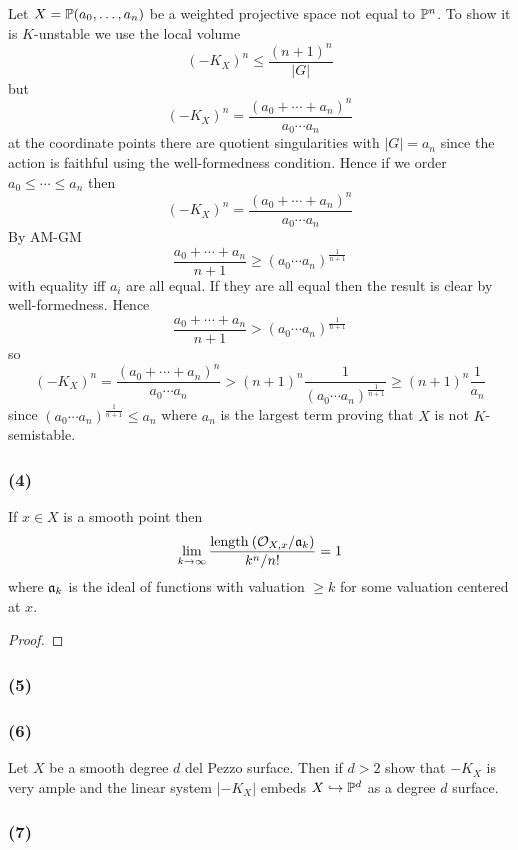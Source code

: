 \documentclass[12pt]{article}
\begin{document}
Let $X = \P(a_0, \dots, a_n)$ be a weighted projective space not equal to $\P^n$. To show it is $K$-unstable we use the local volume
\[ (-K_X)^n \le \frac{(n+1)^n}{|G|} \]
but
\[ (-K_X)^n = \frac{(a_0 + \cdots + a_n)^n}{a_0 \cdots a_n} \]
at the coordinate points there are quotient singularities with $|G| = a_n$ since the action is faithful using the well-formedness condition. Hence if we order $a_0 \le \cdots \le a_n$ then
\[ (-K_X)^n = \frac{(a_0 + \cdots + a_n)^n}{a_0 \cdots a_n}  \]
By AM-GM
\[ \frac{a_0 + \cdots + a_n}{n+1} \ge (a_0 \cdots a_n)^{\frac{1}{n+1}} \]
with equality iff $a_i$ are all equal. If they are all equal then the result is clear by well-formedness. Hence 
\[ \frac{a_0 + \cdots + a_n}{n+1} > (a_0 \cdots a_n)^{\frac{1}{n+1}} \]
so 
\[ (-K_X)^n = \frac{(a_0 + \cdots + a_n)^{n}}{a_0 \cdots a_n} > (n+1)^n \frac{1}{(a_0 \cdots a_n)^{\frac{1}{n+1}}} \ge (n+1)^n \frac{1}{a_n} \]
since $(a_0 \cdots a_n)^{\frac{1}{n+1}} \le a_n$ where $a_n$ is the largest term proving that $X$ is not $K$-semistable.


\subsubsection{(4)}

\begin{lemma}
If $x \in X$ is a smooth point then
\[ \lim_{k \to \infty} \frac{\length{}{\stalk{X}{x} / \a_k}}{k^n / n!} = 1 \]
where $\a_k$ is the ideal of functions with valuation $\ge k$ for some valuation centered at $x$. 
\end{lemma}

\begin{proof}

\end{proof}


\subsubsection{(5)}


\subsubsection{(6)}

Let $X$ be a smooth degree $d$ del Pezzo surface. Then if $d > 2$ show that $-K_X$ is very ample and the linear system $|-K_X|$ embeds $X \embed \P^d$ as a degree $d$ surface.
\bigskip\\


\subsubsection{(7)}
\end{document}
